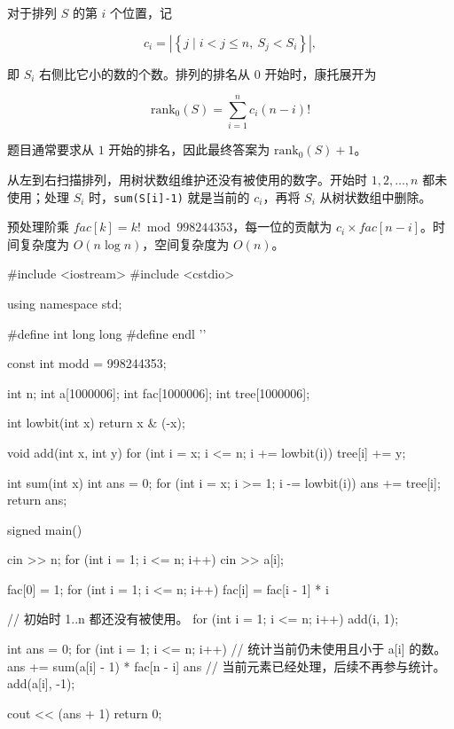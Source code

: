 \documentclass[UTF8,a4paper,11pt]{ctexart}
\newcommand{\topic}[1]{%
  \par\needspace{3\baselineskip}\vspace{0.45em}%
  \noindent{\bfseries\color{Primary}#1}\par\vspace{0.12em}%
}
\begin{document}
\topic{排名公式}

对于排列 $S$ 的第 $i$ 个位置，记

\[
c_i=\left|\left\{j\mid i<j\le n,\ S_j<S_i\right\}\right|,
\]

即 $S_i$ 右侧比它小的数的个数。排列的排名从 $0$ 开始时，康托展开为

\[
\mathrm{rank}_0(S)=\sum_{i=1}^{n}c_i(n-i)!
\]

题目通常要求从 $1$ 开始的排名，因此最终答案为 $\mathrm{rank}_0(S)+1$。

\topic{树状数组求解}

从左到右扫描排列，用树状数组维护还没有被使用的数字。开始时 $1,2,\ldots,n$ 都未使用；处理 $S_i$ 时，\texttt{sum(S[i]-1)} 就是当前的 $c_i$，再将 $S_i$ 从树状数组中删除。

预处理阶乘 $fac[k]=k!\bmod 998244353$，每一位的贡献为 $c_i\times fac[n-i]$。时间复杂度为 $O(n\log n)$，空间复杂度为 $O(n)$。

\begin{CodeBlock}
#include <iostream>
#include <cstdio>

using namespace std;

#define int long long
#define endl '\n'

const int modd = 998244353;

int n;
int a[1000006];
int fac[1000006];
int tree[1000006];

int lowbit(int x) {
    return x & (-x);
}

void add(int x, int y) {
    for (int i = x; i <= n; i += lowbit(i))
        tree[i] += y;
}

int sum(int x) {
    int ans = 0;
    for (int i = x; i >= 1; i -= lowbit(i))
        ans += tree[i];
    return ans;
}

signed main() {
    cin >> n;
    for (int i = 1; i <= n; i++)
        cin >> a[i];

    fac[0] = 1;
    for (int i = 1; i <= n; i++)
        fac[i] = fac[i - 1] * i %

    // 初始时 1..n 都还没有被使用。
    for (int i = 1; i <= n; i++)
        add(i, 1);

    int ans = 0;
    for (int i = 1; i <= n; i++) {
        // 统计当前仍未使用且小于 a[i] 的数。
        ans += sum(a[i] - 1) * fac[n - i] %
        ans %
        // 当前元素已经处理，后续不再参与统计。
        add(a[i], -1);
    }

    cout << (ans + 1) %
    return 0;
}
\end{CodeBlock}
\end{document}
